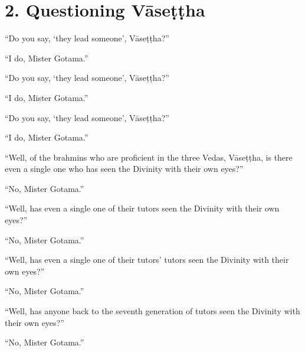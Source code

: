 \documentclass[12pt,openany]{book}%
\begin{document}
\section*{2. Questioning \textsanskrit{Vāseṭṭha} }

“Do you say, ‘they lead someone’, \textsanskrit{Vāseṭṭha}?” 

“I do, Mister Gotama.” 

“Do you say, ‘they lead someone’, \textsanskrit{Vāseṭṭha}?” 

“I do, Mister Gotama.” 

“Do you say, ‘they lead someone’, \textsanskrit{Vāseṭṭha}?” 

“I do, Mister Gotama.” 

“Well, of the brahmins who are proficient in the three Vedas, \textsanskrit{Vāseṭṭha}, is there even a single one who has seen the Divinity with their own eyes?” 

“No, Mister Gotama.” 

“Well, has even a single one of their tutors seen the Divinity with their own eyes?” 

“No, Mister Gotama.” 

“Well, has even a single one of their tutors’ tutors seen the Divinity with their own eyes?” 

“No, Mister Gotama.” 

“Well, has anyone back to the seventh generation of tutors seen the Divinity with their own eyes?” 

“No, Mister Gotama.” 
\end{document}
